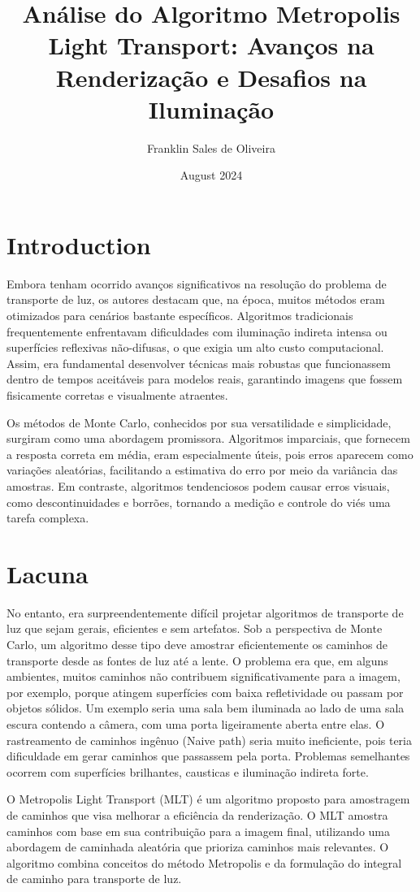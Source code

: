 \documentclass{article}
\title{Análise do Algoritmo Metropolis Light Transport: Avanços na Renderização e Desafios na Iluminação}
\author{Franklin Sales de Oliveira}
\date{August 2024}
\begin{document}
\maketitle

\section{Introduction}

Embora tenham ocorrido avanços significativos na resolução do problema de transporte de luz, os autores destacam que, na época, muitos métodos eram otimizados para cenários bastante específicos. Algoritmos tradicionais frequentemente enfrentavam dificuldades com iluminação indireta intensa ou superfícies reflexivas não-difusas, o que exigia um alto custo computacional. Assim, era fundamental desenvolver técnicas mais robustas que funcionassem dentro de tempos aceitáveis para modelos reais, garantindo imagens que fossem fisicamente corretas e visualmente atraentes.

Os métodos de Monte Carlo, conhecidos por sua versatilidade e simplicidade, surgiram como uma abordagem promissora. Algoritmos imparciais, que fornecem a resposta correta em média, eram especialmente úteis, pois erros aparecem como variações aleatórias, facilitando a estimativa do erro por meio da variância das amostras. Em contraste, algoritmos tendenciosos podem causar erros visuais, como descontinuidades e borrões, tornando a medição e controle do viés uma tarefa complexa.

\section{Lacuna}
No entanto, era surpreendentemente difícil projetar algoritmos de transporte de luz que sejam gerais, eficientes e sem artefatos. Sob a perspectiva de Monte Carlo, um algoritmo desse tipo deve amostrar eficientemente os caminhos de transporte desde as fontes de luz até a lente. O problema era que, em alguns ambientes, muitos caminhos não contribuem significativamente para a imagem, por exemplo, porque atingem superfícies com baixa refletividade ou passam por objetos sólidos. Um exemplo seria uma sala bem iluminada ao lado de uma sala escura contendo a câmera, com uma porta ligeiramente aberta entre elas. O rastreamento de caminhos ingênuo (Naive path) seria muito ineficiente, pois teria dificuldade em gerar caminhos que passassem pela porta. Problemas semelhantes ocorrem com superfícies brilhantes, causticas e iluminação indireta forte.

O Metropolis Light Transport (MLT) é um algoritmo proposto para amostragem de caminhos que visa melhorar a eficiência da renderização. O MLT amostra caminhos com base em sua contribuição para a imagem final, utilizando uma abordagem de caminhada aleatória que prioriza caminhos mais relevantes. O algoritmo combina conceitos do método Metropolis e da formulação do integral de caminho para transporte de luz.
\end{document}
